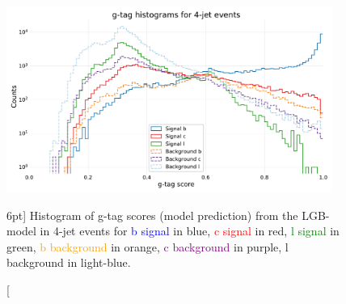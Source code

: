 \documentclass[a4paper, twoside, nobib]{tufte-book}
\begin{document}
\begin{figure}
  \includegraphics[width=0.95\textwidth, trim=10 10 10 40, clip]{figures/quarks/gtag-histogram-sigbkg-down_sample=1.00-ML_vars=vertex-selection=b-ejet_min=4-n_iter_RS_lgb=99-n_iter_RS_xgb=9-cdot_cut=0.90-version=19-njet=4.pdf}
  \caption[g-tag scores in 4-jet events for signal and background][6pt]
          {Histogram of g-tag scores (model prediction) from the LGB-model in 4-jet events for \textcolor{blue}{b signal} in blue, \textcolor{red}{c signal} in red, \textcolor{green}{l signal} in green, \textcolor{orange}{b background} in orange, \textcolor{purple}{c background} in purple, \textcolor{light-blue}{l background} in light-blue.
          } 
  \label{fig:q:gtag_scores_4j_sig_bkg}
\end{figure}
\end{document}
